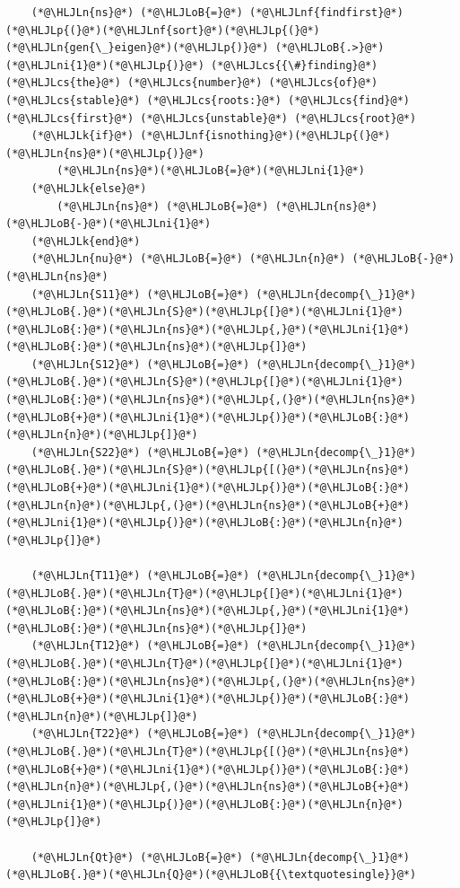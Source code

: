 \documentclass[12pt,a4paper]{article}
\newcommand{\HLJLk}[1]{\textcolor[RGB]{148,91,176}{\textbf{#1}}}
\newcommand{\HLJLn}[1]{#1}
\newcommand{\HLJLnf}[1]{\textcolor[RGB]{66,102,213}{#1}}
\newcommand{\HLJLni}[1]{\textcolor[RGB]{59,151,46}{#1}}
\newcommand{\HLJLoB}[1]{\textcolor[RGB]{102,102,102}{\textbf{#1}}}
\newcommand{\HLJLp}[1]{#1}
\newcommand{\HLJLcs}[1]{\textcolor[RGB]{153,153,119}{\textit{#1}}}
\begin{document}
\begin{lstlisting}
    (*@\HLJLn{ns}@*) (*@\HLJLoB{=}@*) (*@\HLJLnf{findfirst}@*)(*@\HLJLp{(}@*)(*@\HLJLnf{sort}@*)(*@\HLJLp{(}@*)(*@\HLJLn{gen{\_}eigen}@*)(*@\HLJLp{)}@*) (*@\HLJLoB{.>}@*) (*@\HLJLni{1}@*)(*@\HLJLp{)}@*) (*@\HLJLcs{{\#}finding}@*) (*@\HLJLcs{the}@*) (*@\HLJLcs{number}@*) (*@\HLJLcs{of}@*) (*@\HLJLcs{stable}@*) (*@\HLJLcs{roots:}@*) (*@\HLJLcs{find}@*) (*@\HLJLcs{first}@*) (*@\HLJLcs{unstable}@*) (*@\HLJLcs{root}@*)
    (*@\HLJLk{if}@*) (*@\HLJLnf{isnothing}@*)(*@\HLJLp{(}@*)(*@\HLJLn{ns}@*)(*@\HLJLp{)}@*)
        (*@\HLJLn{ns}@*)(*@\HLJLoB{=}@*)(*@\HLJLni{1}@*)
    (*@\HLJLk{else}@*)
        (*@\HLJLn{ns}@*) (*@\HLJLoB{=}@*) (*@\HLJLn{ns}@*) (*@\HLJLoB{-}@*)(*@\HLJLni{1}@*)
    (*@\HLJLk{end}@*)
    (*@\HLJLn{nu}@*) (*@\HLJLoB{=}@*) (*@\HLJLn{n}@*) (*@\HLJLoB{-}@*) (*@\HLJLn{ns}@*)
    (*@\HLJLn{S11}@*) (*@\HLJLoB{=}@*) (*@\HLJLn{decomp{\_}1}@*)(*@\HLJLoB{.}@*)(*@\HLJLn{S}@*)(*@\HLJLp{[}@*)(*@\HLJLni{1}@*)(*@\HLJLoB{:}@*)(*@\HLJLn{ns}@*)(*@\HLJLp{,}@*)(*@\HLJLni{1}@*)(*@\HLJLoB{:}@*)(*@\HLJLn{ns}@*)(*@\HLJLp{]}@*)
    (*@\HLJLn{S12}@*) (*@\HLJLoB{=}@*) (*@\HLJLn{decomp{\_}1}@*)(*@\HLJLoB{.}@*)(*@\HLJLn{S}@*)(*@\HLJLp{[}@*)(*@\HLJLni{1}@*)(*@\HLJLoB{:}@*)(*@\HLJLn{ns}@*)(*@\HLJLp{,(}@*)(*@\HLJLn{ns}@*)(*@\HLJLoB{+}@*)(*@\HLJLni{1}@*)(*@\HLJLp{)}@*)(*@\HLJLoB{:}@*)(*@\HLJLn{n}@*)(*@\HLJLp{]}@*)
    (*@\HLJLn{S22}@*) (*@\HLJLoB{=}@*) (*@\HLJLn{decomp{\_}1}@*)(*@\HLJLoB{.}@*)(*@\HLJLn{S}@*)(*@\HLJLp{[(}@*)(*@\HLJLn{ns}@*)(*@\HLJLoB{+}@*)(*@\HLJLni{1}@*)(*@\HLJLp{)}@*)(*@\HLJLoB{:}@*)(*@\HLJLn{n}@*)(*@\HLJLp{,(}@*)(*@\HLJLn{ns}@*)(*@\HLJLoB{+}@*)(*@\HLJLni{1}@*)(*@\HLJLp{)}@*)(*@\HLJLoB{:}@*)(*@\HLJLn{n}@*)(*@\HLJLp{]}@*)

    (*@\HLJLn{T11}@*) (*@\HLJLoB{=}@*) (*@\HLJLn{decomp{\_}1}@*)(*@\HLJLoB{.}@*)(*@\HLJLn{T}@*)(*@\HLJLp{[}@*)(*@\HLJLni{1}@*)(*@\HLJLoB{:}@*)(*@\HLJLn{ns}@*)(*@\HLJLp{,}@*)(*@\HLJLni{1}@*)(*@\HLJLoB{:}@*)(*@\HLJLn{ns}@*)(*@\HLJLp{]}@*)
    (*@\HLJLn{T12}@*) (*@\HLJLoB{=}@*) (*@\HLJLn{decomp{\_}1}@*)(*@\HLJLoB{.}@*)(*@\HLJLn{T}@*)(*@\HLJLp{[}@*)(*@\HLJLni{1}@*)(*@\HLJLoB{:}@*)(*@\HLJLn{ns}@*)(*@\HLJLp{,(}@*)(*@\HLJLn{ns}@*)(*@\HLJLoB{+}@*)(*@\HLJLni{1}@*)(*@\HLJLp{)}@*)(*@\HLJLoB{:}@*)(*@\HLJLn{n}@*)(*@\HLJLp{]}@*)
    (*@\HLJLn{T22}@*) (*@\HLJLoB{=}@*) (*@\HLJLn{decomp{\_}1}@*)(*@\HLJLoB{.}@*)(*@\HLJLn{T}@*)(*@\HLJLp{[(}@*)(*@\HLJLn{ns}@*)(*@\HLJLoB{+}@*)(*@\HLJLni{1}@*)(*@\HLJLp{)}@*)(*@\HLJLoB{:}@*)(*@\HLJLn{n}@*)(*@\HLJLp{,(}@*)(*@\HLJLn{ns}@*)(*@\HLJLoB{+}@*)(*@\HLJLni{1}@*)(*@\HLJLp{)}@*)(*@\HLJLoB{:}@*)(*@\HLJLn{n}@*)(*@\HLJLp{]}@*)

    (*@\HLJLn{Qt}@*) (*@\HLJLoB{=}@*) (*@\HLJLn{decomp{\_}1}@*)(*@\HLJLoB{.}@*)(*@\HLJLn{Q}@*)(*@\HLJLoB{{\textquotesingle}}@*)


\end{lstlisting}
\end{document}
